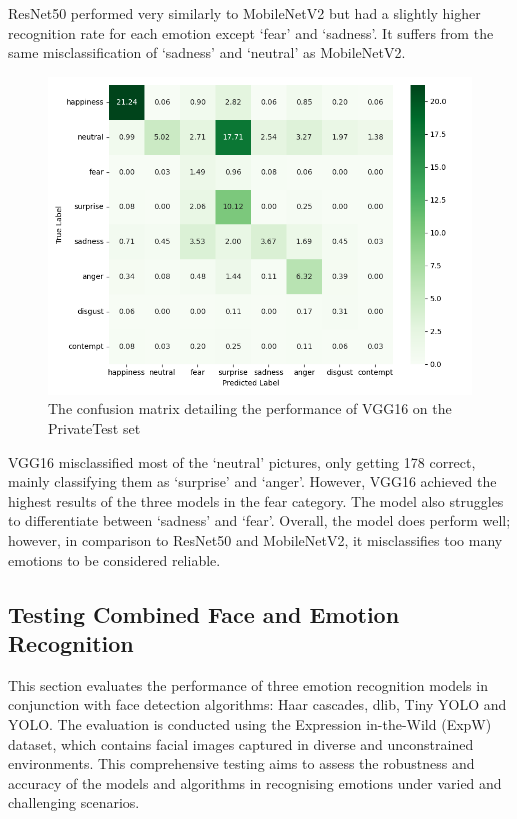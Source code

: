ResNet50 performed very similarly to MobileNetV2 but had a slightly higher recognition rate for each emotion except `fear' and `sadness'. It suffers from the same misclassification of `sadness' and `neutral' as MobileNetV2.

\begin{figure}[H]
    \centering{}
    \includegraphics[scale=0.58]{fed_images/conf_matrix_VGG16_percentage.png}
    \caption{The confusion matrix detailing the performance of VGG16 on the PrivateTest set}
    \label{figure:conf_vgg16}
\end{figure}

VGG16 misclassified most of the `neutral' pictures, only getting 178 correct, mainly classifying them as `surprise' and `anger'. However, VGG16 achieved the highest results of the three models in the fear category. The model also struggles to differentiate between `sadness' and `fear'. Overall, the model does perform well; however, in comparison to ResNet50 and MobileNetV2, it misclassifies too many emotions to be considered reliable.

\subsection{Testing Combined Face and Emotion Recognition}

This section evaluates the performance of three emotion recognition models in conjunction with face detection algorithms: Haar cascades, dlib, Tiny YOLO and YOLO. The evaluation is conducted using the Expression in-the-Wild (ExpW) dataset, which contains facial images captured in diverse and unconstrained environments. This comprehensive testing aims to assess the robustness and accuracy of the models and algorithms in recognising emotions under varied and challenging scenarios.

